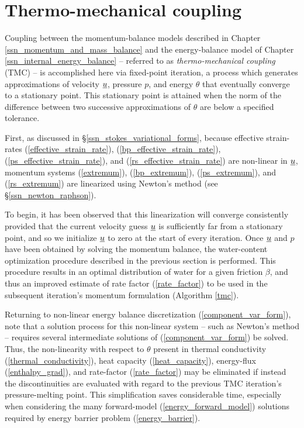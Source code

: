 
\chapter{Thermo-mechanical coupling} \label{ssn_thermo_mechanical_coupling}

Coupling between the momentum-balance models described in Chapter \ref{ssn_momentum_and_mass_balance} and the energy-balance model of Chapter \ref{ssn_internal_energy_balance} -- referred to as  \emph{thermo-mechanical coupling} (TMC) -- is accomplished here via fixed-point iteration, a process which generates approximations of velocity $\underline{u}$, pressure $p$, and energy $\theta$ that eventually converge to a stationary point.  This stationary point is attained when the norm of the difference between two successive approximations of $\theta$ are below a specified tolerance.

First, as discussed in \S \ref{ssn_stokes_variational_forms}, because effective strain-rates (\ref{effective_strain_rate}), (\ref{bp_effective_strain_rate}), (\ref{ps_effective_strain_rate}), and (\ref{rs_effective_strain_rate}) are non-linear in $\underline{u}$, momentum systems (\ref{extremum}), (\ref{bp_extremum}), (\ref{ps_extremum}), and (\ref{rs_extremum}) are linearized using Newton's method (see \S \ref{ssn_newton_raphson}).

To begin, it has been observed that this linearization will converge consistently provided that the current velocity guess $\underline{u}$ is sufficiently far from a stationary point, and so we initialize $\underline{u}$ to zero at the start of every iteration.  Once $\underline{u}$ and $p$ have been obtained by solving the momentum balance, the water-content optimization procedure described in the previous section is performed.  This procedure results in an optimal distribution of water for a given friction $\beta$, and thus an improved estimate of rate factor (\ref{rate_factor}) to be used in the subsequent iteration's momentum formulation (Algorithm \ref{tmc}).

Returning to non-linear energy balance discretization (\ref{component_var_form}), note that a solution process for this non-linear system -- such as Newton's method -- requires several intermediate solutions of (\ref{component_var_form}) be solved.  Thus, the non-linearity with respect to $\theta$ present in thermal conductivity (\ref{thermal_conductivity}), heat capacity (\ref{heat_capacity}), energy-flux (\ref{enthalpy_grad}), and rate-factor (\ref{rate_factor}) may be eliminated if instead the discontinuities are evaluated with regard to the previous TMC iteration's pressure-melting point.  This simplification saves considerable time, especially when considering the many forward-model (\ref{energy_forward_model}) solutions required by energy barrier problem (\ref{energy_barrier}).

